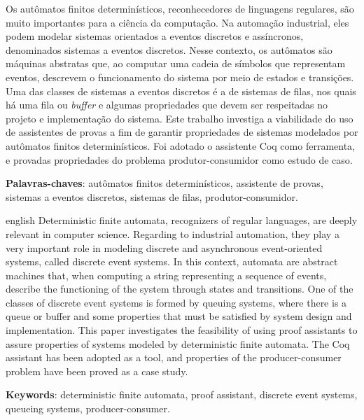 \begin{resumo}
Os autômatos finitos determinísticos, reconhecedores de linguagens regulares, são muito importantes para a ciência da computação. Na automação industrial, eles podem modelar sistemas orientados a eventos discretos e assíncronos, denominados sistemas a eventos discretos. Nesse contexto, os autômatos são máquinas abstratas que, ao computar uma cadeia de símbolos que representam eventos, descrevem o funcionamento do sistema por meio de estados e transições. Uma das classes de sistemas a eventos discretos é a de sistemas de filas, nos quais há uma fila ou \textit{buffer} e algumas propriedades que devem ser respeitadas no projeto e implementação do sistema. Este trabalho investiga a viabilidade do uso de assistentes de provas a fim de garantir propriedades de sistemas modelados por autômatos finitos determinísticos. Foi adotado o assistente Coq como ferramenta, e provadas propriedades do problema produtor-consumidor como estudo de caso.

 \vspace{\onelineskip}
 
 \noindent
 \textbf{Palavras-chaves}: autômatos finitos determinísticos, assistente de provas, sistemas a eventos discretos, sistemas de filas, produtor-consumidor.
\end{resumo}


\begin{resumo}[Abstract]
 \begin{otherlanguage*}{english}
Deterministic finite automata, recognizers of regular languages, are deeply relevant in computer science. Regarding to industrial automation, they play a very important role in modeling discrete and asynchronous event-oriented systems, called discrete event systems. In this context, automata are abstract machines that, when computing a string representing a sequence of events, describe the functioning of the system through states and transitions. One of the classes of discrete event systems is formed by queuing systems, where there is a queue or buffer and some properties that must be satisfied by system design and implementation. This paper investigates the feasibility of using proof assistants to assure properties of systems modeled by deterministic finite automata. The Coq assistant has been adopted as a tool, and properties of the producer-consumer problem have been proved as a case study.

 \vspace{\onelineskip}

 \noindent 
 \textbf{Keywords}: deterministic finite automata, proof assistant, discrete event systems, queueing systems, producer-consumer.
 \end{otherlanguage*}
\end{resumo}


\listoffigures*
\cleardoublepage




\listofquadros*
\cleardoublepage
